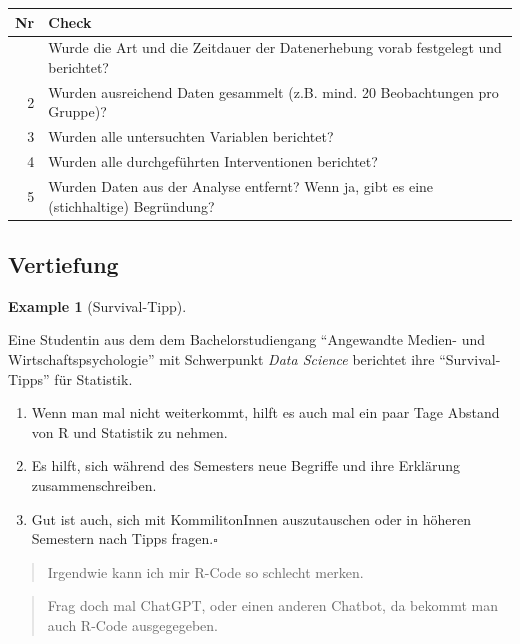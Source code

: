 \documentclass[
  letterpaper,
  DIV=11,
  numbers=noendperiod]{scrartcl}
\providecommand{\tightlist}{%
  \setlength{\itemsep}{0pt}\setlength{\parskip}{0pt}}\usepackage{longtable,booktabs,array}
\theoremstyle{definition}
\newtheorem{example}{Example}[section]
\theoremstyle{definition}
\theoremstyle{definition}
\theoremstyle{remark}
\begin{document}
\begin{longtable*}{rl}
\toprule
Nr & Check \\ 
\midrule{} & Wurde die Art und die Zeitdauer der Datenerhebung vorab festgelegt und berichtet? \\ 
2 & Wurden ausreichend Daten gesammelt (z.B. mind. 20 Beobachtungen pro Gruppe)? \\ 
3 & Wurden alle untersuchten Variablen berichtet? \\ 
4 & Wurden alle durchgeführten Interventionen berichtet? \\ 
5 & Wurden Daten aus der Analyse entfernt? Wenn ja, gibt es eine (stichhaltige) Begründung? \\ 
\bottomrule
\end{longtable*}

\subsection{Vertiefung}\label{vertiefung}

\begin{example}[Survival-Tipp]\protect\hypertarget{exm-survival1}{}\label{exm-survival1}

Eine Studentin aus dem dem Bachelorstudiengang ``Angewandte Medien- und
Wirtschaftspsychologie'' mit Schwerpunkt \emph{Data Science} berichtet
ihre ``Survival-Tipps'' für Statistik.

\begin{enumerate}
\def\labelenumi{\arabic{enumi}.}
\tightlist
\item
  Wenn man mal nicht weiterkommt, hilft es auch mal ein paar Tage
  Abstand von R und Statistik zu nehmen.
\item
  Es hilft, sich während des Semesters neue Begriffe und ihre Erklärung
  zusammenschreiben.
\item
  Gut ist auch, sich mit KommilitonInnen auszutauschen oder in höheren
  Semestern nach Tipps fragen.\(\square\)
\end{enumerate}

\end{example}

\begin{quote}
{} Irgendwie kann ich mir R-Code so schlecht merken.
\end{quote}

\begin{quote}
{} Frag doch mal ChatGPT, oder einen anderen Chatbot, da
bekommt man auch R-Code ausgegegeben.
\end{quote}
\end{document}
